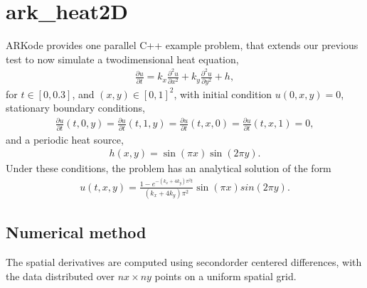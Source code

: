 \documentclass[letterpaper,10pt,english]{sphinxmanual}
\begin{document}
\section{ark\_heat2D}
\label{\detokenize{cpp_parallel:ark-heat2d}}\label{\detokenize{cpp_parallel:id1}}
\sphinxAtStartPar
ARKode provides one parallel C++ example problem, that extends our
previous {\hyperref[\detokenize{c_serial:ark-heat1d}]{}} test to now simulate a two\sphinxhyphen{}dimensional heat
equation,
\begin{equation*}
\begin{split}\frac{\partial u}{\partial t} = k_x \frac{\partial^2 u}{\partial x^2}
                              + k_y \frac{\partial^2 u}{\partial y^2} + h,\end{split}
\end{equation*}
\sphinxAtStartPar
for \(t \in [0, 0.3]\), and \((x,y) \in [0, 1]^2\), with initial
condition \(u(0,x,y) = 0\), stationary boundary conditions,
\begin{equation*}
\begin{split}\frac{\partial u}{\partial t}(t,0,y) = \frac{\partial u}{\partial t}(t,1,y) =
\frac{\partial u}{\partial t}(t,x,0) = \frac{\partial u}{\partial t}(t,x,1) = 0,\end{split}
\end{equation*}
\sphinxAtStartPar
and a periodic heat source,
\begin{equation*}
\begin{split}h(x,y) = \sin(\pi x) \sin(2\pi y).\end{split}
\end{equation*}
\sphinxAtStartPar
Under these conditions, the problem has an analytical solution of the
form
\begin{equation*}
\begin{split}u(t,x,y) = \frac{1 - e^{-(k_x+4k_y)\pi^2 t}}{(k_x+4k_y)\pi^2} \sin(\pi x) sin(2\pi y).\end{split}
\end{equation*}

\subsection{Numerical method}
\label{\detokenize{cpp_parallel:numerical-method}}
\sphinxAtStartPar
The spatial derivatives are computed using second\sphinxhyphen{}order centered
differences, with the data distributed over \(nx\times ny\) points
on a uniform spatial grid.
\end{document}
